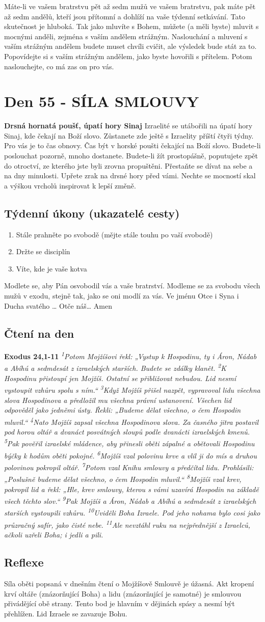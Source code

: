 \documentclass[11pt]{article}
\newcommand{\zacatekOsmyTyden}{
  \textbf{Drsná hornatá poušť, úpatí hory Sinaj} \newline 
  Izraelité se utábořili na úpatí hory Sinaj, kde čekají na Boží slovo. Zůstanete zde ještě s Izraelity příští čtyři týdny. Pro vás je to čas obnovy. Čas být v horské poušti čekající na Boží slovo. Budete-li poslouchat pozorně, mnoho dostanete. Budete-li žít prostopášně, poputujete zpět do otroctví, ze kterého jste byli zrovna propuštěni. Přestaňte se dívat na sebe a na dny minulosti. Upřete zrak na drsné hory před vámi. Nechte se mocností skal a výškou vrcholů inspirovat k lepší změně.
  \subsection*{Týdenní úkony (ukazatelé cesty)}
\begin{enumerate}
  \item Stále prahněte po svobodě (mějte stále touhu po vaší svobodě)
  \item Držte se disciplín
  \item Víte, kde je vaše kotva
\end{enumerate}
Modlete se, aby Pán osvobodil vás a vaše bratrství. \newline
Modleme se za svobodu všech mužů v exodu, stejně tak, jako se oni modlí za vás.\newline
Ve jménu Otce i Syna i Ducha svatého …  Otče náš… Amen
}
\begin{document}
Máte-li ve vašem bratrstvu pět až sedm mužů ve vašem bratrstvu, pak máte pět až sedm andělů, kteří jsou přítomní a
dohlíží na vaše týdenní setkávání. Tato skutečnost je hluboká. Tak jako mluvíte s Bohem, můžete (a měli byste) mluvit
s mocnými anděli, zejména s vaším andělem strážným. Naslouchání a mluvení s vaším strážným andělem budete muset
chvíli cvičit, ale výsledek bude stát za to. Popovídejte si s vaším strážným andělem, jako byste hovořili s přítelem.
Potom naslouchejte, co má zas on pro vás.

\newpage
\section{Den 55 - SÍLA SMLOUVY }
\zacatekOsmyTyden
\subsection*{Čtení na den}
\textbf{Exodus 24,1-11}
\newline
\textit{
\textsuperscript{1}Potom Mojžíšovi řekl: „Vystup k Hospodinu, ty i Áron, Nádab a Abíhú a sedmdesát z izraelských starších. Budete se zdálky klanět.
\textsuperscript{2}K Hospodinu přistoupí jen Mojžíš. Ostatní se přibližovat nebudou. Lid nesmí vystoupit vzhůru spolu s ním.“
\textsuperscript{3}Když Mojžíš přišel nazpět, vypravoval lidu všechna slova Hospodinova a předložil mu všechna právní ustanovení. Všechen lid odpověděl jako jedněmi ústy. Řekli: „Budeme dělat všechno, o čem Hospodin mluvil.“
\textsuperscript{4}Nato Mojžíš zapsal všechna Hospodinova slova. Za časného jitra postavil pod horou oltář a dvanáct posvátných sloupů podle dvanácti izraelských kmenů.
\textsuperscript{5}Pak pověřil izraelské mládence, aby přinesli oběti zápalné a obětovali Hospodinu býčky k hodům oběti pokojné.
\textsuperscript{6}Mojžíš vzal polovinu krve a vlil ji do mís a druhou polovinou pokropil oltář.
\textsuperscript{7}Potom vzal Knihu smlouvy a předčítal lidu. Prohlásili: „Poslušně budeme dělat všechno, o čem Hospodin mluvil.“
\textsuperscript{8}Mojžíš vzal krev, pokropil lid a řekl: „Hle, krev smlouvy, kterou s vámi uzavírá Hospodin na základě všech těchto slov.“
\textsuperscript{9}Pak Mojžíš a Áron, Nádab a Abíhú a sedmdesát z izraelských starších vystoupili vzhůru.
\textsuperscript{10}Uviděli Boha Izraele. Pod jeho nohama bylo cosi jako průzračný safír, jako čisté nebe.
\textsuperscript{11}Ale nevztáhl ruku na nejpřednější z Izraelců, ačkoli uzřeli Boha; i jedli a pili.
}

\subsection*{Reflexe}
Síla oběti popsaná v dnešním čtení o Mojžíšově Smlouvě je úžasná. Akt kropení krví oltáře (znázorňující
Boha) a lidu (znázorňující je samotné) je smlouvou přivádějící obě strany. Tento bod je hlavním v dějinách
spásy a nesmí být přehlížen. Lid Izraele se zavazuje Bohu.
\end{document}
